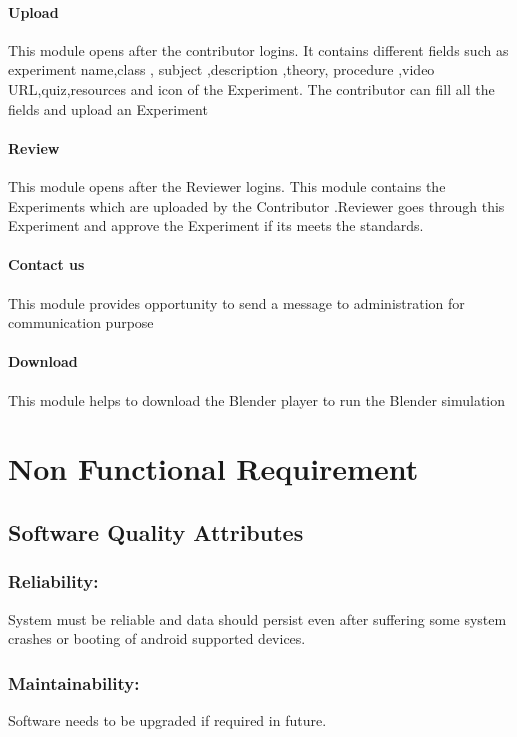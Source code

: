 \documentclass[12pt]{report}
\begin{document}
\subsubsection{Upload}
This module  opens after  the contributor logins. It contains different fields such as experiment name,class , subject ,description ,theory, procedure ,video URL,quiz,resources and icon of the Experiment. The contributor can fill all the fields and upload an Experiment


\subsubsection{Review}
This module opens after the Reviewer logins. This module contains the Experiments which are uploaded by the Contributor .Reviewer goes through this Experiment and approve  the Experiment if its meets the standards.

\subsubsection{Contact us}
This module provides opportunity to send a message to administration for communication purpose

\subsubsection{Download}
This module helps to download the Blender player to run the Blender simulation

\chapter{Non Functional Requirement}
\section{Software Quality Attributes }
\subsection{Reliability:}
System must be reliable and data should persist even after suffering some system crashes or booting of android supported devices. 

\subsection{Maintainability:}
Software needs to be upgraded if required in future. 
\end{document}
